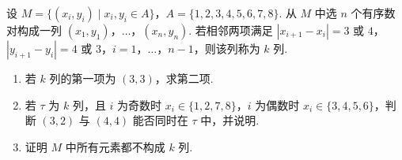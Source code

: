 \begin{problem}
设 \(M=\{(x_i,y_i)\mid x_i,y_i\in A\}\)，\(A=\{1,2,3,4,5,6,7,8\}\). 从 \(M\) 中选 \(n\) 个有序数对构成一列 \((x_1,y_1)\)，\(\dots\)，\((x_n,y_n)\). 若相邻两项满足 \(|x_{i+1}-x_i|=3\text{\ 或\ }4\)，\(|y_{i+1}-y_i|=4\text{\ 或\ }3\)，\(i=1\)，\(\dots\)，\(n-1\)，则该列称为 \(k\) 列.

\begin{enumerate}
    \item 若 \(k\) 列的第一项为 \((3,3)\)，求第二项.
    \item 若 \(\tau\) 为 \(k\) 列，且 \(i\) 为奇数时 \(x_i\in\{1,2,7,8\}\)，\(i\) 为偶数时 \(x_i\in\{3,4,5,6\}\)，判断 \((3,2)\) 与 \((4,4)\) 能否同时在 \(\tau\) 中，并说明.
    \item 证明 \(M\) 中所有元素都不构成 \(k\) 列.
\end{enumerate}
\end{problem}

